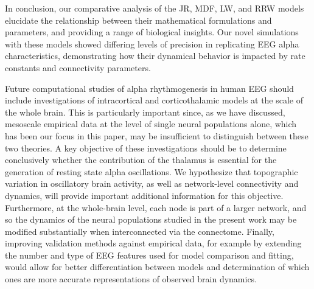 \documentclass[12pt,twoside]{article}
\begin{document}
In conclusion, our comparative analysis of the JR, MDF, LW, and RRW models elucidate the relationship between their mathematical formulations and parameters, and providing a range of biological insights. Our novel simulations with these models showed differing levels of precision in replicating EEG alpha characteristics, demonstrating how their dynamical behavior is impacted by rate constants and connectivity parameters.

Future computational studies of alpha rhythmogenesis in human EEG should include investigations of intracortical and corticothalamic models at the scale of the whole brain. This is particularly important since, as we have discussed, mesoscale empirical data at the level of single neural populations alone, which has been our focus in this paper, may be insufficient to distinguish between these two theories. A key objective of these investigations should be to determine conclusively whether the contribution of the thalamus is essential for the generation of resting state alpha oscillations. We hypothesize that topographic variation in oscillatory brain activity, as well as network-level connectivity and dynamics, will provide important additional information for this objective. Furthermore, at the whole-brain level, each node is part of a larger network, and so the dynamics of the neural populations studied in the present work may be modified substantially when interconnected via the connectome. Finally, improving validation methods against empirical data, for example by extending the number and type of EEG features used for model comparison and fitting, would allow for better differentiation between models and determination of which ones are more accurate representations of observed brain dynamics.
\end{document}
